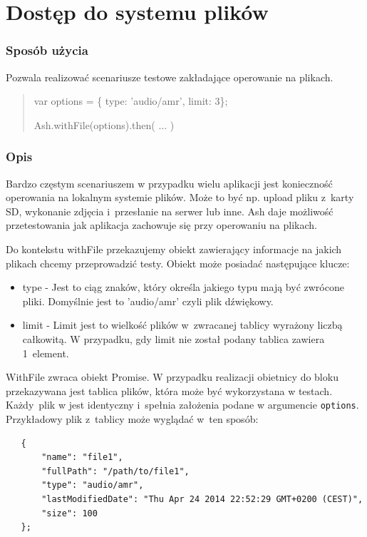 \documentclass[brudnopis]{xmgr}
\begin{document}
\section{Dostęp do systemu plików}

\subsubsection{Sposób użycia}
Pozwala realizować scenariusze testowe zakładające operowanie na plikach.

\begin{quote}
var options = \{ type: 'audio/amr', limit: 3\};

Ash.withFile(options).then( ... )
\end{quote}

\subsubsection{Opis}

Bardzo częstym scenariuszem w przypadku wielu aplikacji jest konieczność operowania na lokalnym systemie plików. Może to być np. upload pliku z~karty SD, wykonanie zdjęcia i~przesłanie na serwer lub inne. Ash daje możliwość przetestowania jak aplikacja zachowuje się przy operowaniu na plikach.  

Do kontekstu withFile przekazujemy obiekt zawierający informacje na jakich plikach chcemy przeprowadzić testy. Obiekt może posiadać następujące klucze:

\begin{itemize}
  \item type - Jest to ciąg znaków, który określa jakiego typu mają być zwrócone pliki. Domyślnie jest to 'audio/amr' czyli plik dźwiękowy. 
  \item limit - Limit jest to wielkość plików w~zwracanej tablicy wyrażony liczbą całkowitą. W przypadku, gdy limit nie został podany tablica zawiera 1~element. 
\end{itemize}

WithFile zwraca obiekt Promise. W przypadku realizacji obietnicy do bloku przekazywana jest tablica plików, która może być wykorzystana w testach. Każdy~plik w jest identyczny i~spełnia założenia podane w argumencie \texttt{options}. Przykładowy plik z~tablicy może wyglądać w~ten sposób:

\begin{lstlisting}
   {
       "name": "file1",
       "fullPath": "/path/to/file1",
       "type": "audio/amr",
       "lastModifiedDate": "Thu Apr 24 2014 22:52:29 GMT+0200 (CEST)",
       "size": 100
   };
\end{lstlisting}
\end{document}
